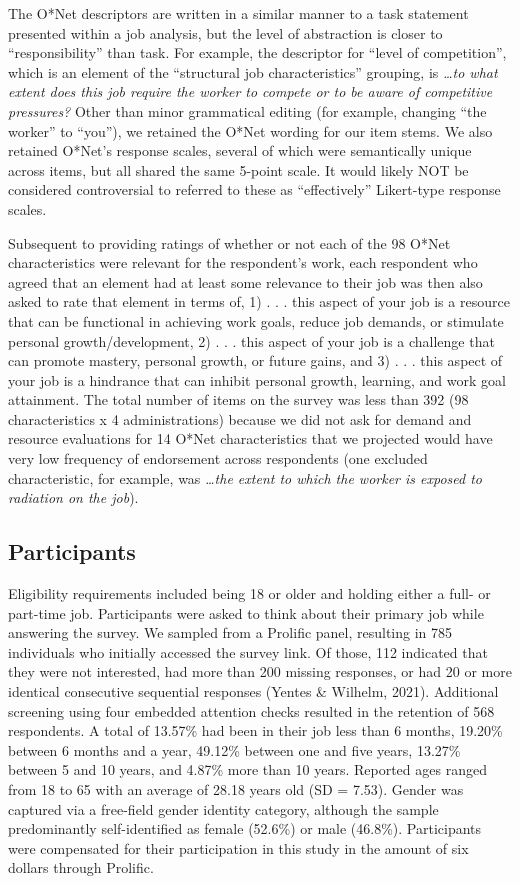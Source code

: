 \documentclass[
  man]{apa6}
\begin{document}
The O*Net descriptors are written in a similar manner to a task statement presented within a job analysis, but the level of abstraction is closer to ``responsibility'' than task. For example, the descriptor for ``level of competition'', which is an element of the ``structural job characteristics'' grouping, is \emph{\ldots to what extent does this job require the worker to compete or to be aware of competitive pressures?} Other than minor grammatical editing (for example, changing ``the worker'' to ``you''), we retained the O*Net wording for our item stems. We also retained O*Net's response scales, several of which were semantically unique across items, but all shared the same 5-point scale. It would likely NOT be considered controversial to referred to these as ``effectively'' Likert-type response scales.

Subsequent to providing ratings of whether or not each of the 98 O*Net characteristics were relevant for the respondent's work, each respondent who agreed that an element had at least some relevance to their job was then also asked to rate that element in terms of, 1) . . . this aspect of your job is a resource that can be functional in achieving work goals, reduce job demands, or stimulate personal growth/development, 2) . . . this aspect of your job is a challenge that can promote mastery, personal growth, or future gains, and 3) . . . this aspect of your job is a hindrance that can inhibit personal growth, learning, and work goal attainment.
The total number of items on the survey was less than 392 (98 characteristics x 4 administrations) because we did not ask for demand and resource evaluations for 14 O*Net characteristics that we projected would have very low frequency of endorsement across respondents (one excluded characteristic, for example, was \emph{\ldots the extent to which the worker is exposed to radiation on the job}).

\hypertarget{participants}{%
\subsection{Participants}\label{participants}}

Eligibility requirements included being 18 or older and holding either a full- or part-time job. Participants were asked to think about their primary job while answering the survey. We sampled from a Prolific panel, resulting in 785 individuals who initially accessed the survey link. Of those, 112 indicated that they were not interested, had more than 200 missing responses, or had 20 or more identical consecutive sequential responses (Yentes \& Wilhelm, 2021). Additional screening using four embedded attention checks resulted in the retention of 568 respondents. A total of 13.57\% had been in their job less than 6 months, 19.20\% between 6 months and a year, 49.12\% between one and five years, 13.27\% between 5 and 10 years, and 4.87\% more than 10 years. Reported ages ranged from 18 to 65 with an average of 28.18 years old (SD = 7.53). Gender was captured via a free-field gender identity category, although the sample predominantly self-identified as female (52.6\%) or male (46.8\%). Participants were compensated for their participation in this study in the amount of six dollars through Prolific.
\end{document}
